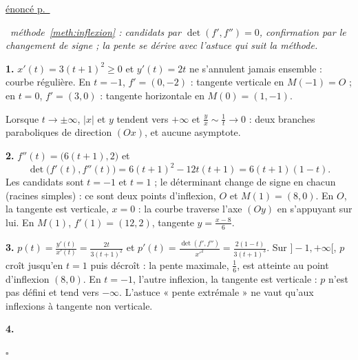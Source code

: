 \documentclass[a4paper,11pt]{article}
\numberwithin{equation}{section}
\numberwithin{figure}{section}
\numberwithin{table}{section}
\theoremstyle{enonce}
\theoremstyle{exemple}
\theoremstyle{remarque}
\newenvironment{corrige}[1]{%
  \par\needspace{6\baselineskip}\vspace{1em}\phantomsection\label{c:#1}%
  \noindent{\sffamily\bfseries\color{Bleu}Exercice~\ref{e:#1}}\quad
  {\scriptsize\sffamily\hyperref[e:#1]{\color{Gris}énoncé p.~\pageref{e:#1}}}\par\nobreak\vspace{0.2em}}%
  {\hfill\textcolor{BleuClair}{$\square$}\par}
\newcommand{\demarche}[1]{\noindent{\sffamily\bfseries\small\color{BleuMoyen}Démarche.}\ \textit{#1}\par\smallskip}
\begin{document}
\begin{corrige}{infl2}
\demarche{méthode~\ref{meth:inflexion} : candidats par $\det(f',f'')=0$, confirmation par le changement de signe ; la pente se dérive avec l'astuce qui suit la méthode.}
\textbf{1.} $x'(t)=3(t+1)^2\geq0$ et $y'(t)=2t$ ne s'annulent jamais ensemble : courbe régulière. En $t=-1$, $f'=(0,-2)$ :
tangente verticale en $M(-1)=O$ ; en $t=0$, $f'=(3,0)$ : tangente horizontale en $M(0)=(1,-1)$.
\begin{center}
\end{center}
Lorsque $t\to\pm\infty$, $|x|$ et $y$ tendent vers $+\infty$ et $\frac yx\sim\frac1t\to0$ : deux branches paraboliques de
direction $(Ox)$, et aucune asymptote.

\textbf{2.} $f''(t)=\big(6(t+1),2\big)$ et
\[\det\big(f'(t),f''(t)\big)=6(t+1)^2-12t(t+1)=6(t+1)(1-t).\]
Les candidats sont $t=-1$ et $t=1$ ; le déterminant change de signe en chacun (racines simples) : ce sont deux points
d'inflexion, $O$ et $M(1)=(8,0)$. En $O$, la tangente est verticale, $x=0$ : la courbe traverse l'axe $(Oy)$ en
s'appuyant sur lui. En $M(1)$, $f'(1)=(12,2)$, tangente $y=\frac{x-8}6$.

\textbf{3.} $p(t)=\frac{y'(t)}{x'(t)}=\frac{2t}{3(t+1)^2}$ et $p'(t)=\frac{\det(f',f'')}{x'^2}=\frac{2(1-t)}{3(t+1)^3}$. Sur
$]-1,+\infty[$, $p$ croît jusqu'en $t=1$ puis décroît : la pente maximale, $\frac16$, est atteinte au point d'inflexion
$(8,0)$. En $t=-1$, l'autre inflexion, la tangente est verticale : $p$ n'est pas défini et tend vers $-\infty$. L'astuce
« pente extrémale » ne vaut qu'aux inflexions à tangente non verticale.

\textbf{4.}
\begin{center}
\end{center}
\end{corrige}
\end{document}
